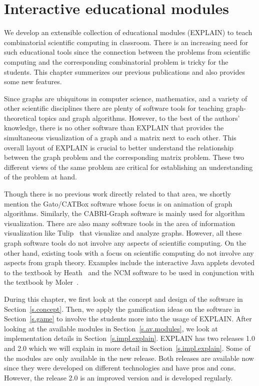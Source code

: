 \documentclass[12pt, twoside,a4paper,toc=bibliography]{scrbook}
\newcommand{\secref}[1]{Section~\protect\ref{#1}}
\begin{document}
\chapter{Interactive educational modules}
\label{explain}
We develop an extensible collection of educational modules (\mbox{EXPLAIN})
to teach combinatorial scientific computing in classroom.
There is an increasing need for such educational tools since the connection
between the problems from scientific computing and the corresponding combinatorial
problem is tricky for the students. This chapter summerizes our previous publications
\cite{2013:05,2014:01,2014:02,2014:09,2015:3} and also provides some new features.

Since graphs are ubiquitous in computer science, mathematics, and a variety of other scientific
disciplines there are plenty of software tools for teaching graph-theoretical topics and graph
algorithms. However, to the best of the authors' knowledge, there is no other software than EXPLAIN
that provides the simultaneous visualization of a graph and a matrix next to each other. This
overall layout of EXPLAIN is crucial to better understand the relationship between the graph
problem and the corresponding matrix problem. These two different views of the same problem are
critical for establishing an understanding of the problem at hand.

Though there is no previous work directly related to that area, we shortly mention the Gato/CATBox
\cite{gato2002} software whose focus is on animation of graph algorithms. Similarly, the
CABRI-Graph \cite{CABRI96} software is mainly used for algorithm visualization. There are also many
software tools in the area of information visualization like
Tulip~\cite{auber:tulip3,tulippython2012} that visualize and analyze graphs. However, all these
graph software tools do not involve any aspects of scientific computing. On the other hand,
existing tools with a focus on scientific computing do not involve any aspects from graph theory.
Examples include the interactive Java applets devoted to the textbook by Heath~\cite{MH96SCAIS} and
the NCM software to be used in conjunction with the textbook by Moler~\cite{mol:num}.

During this chapter, we first look at the concept and design of the software in
\secref{s.concept}. Then, we apply the gamification ideas on the software in
\secref{s.game} to involve the students more into the usage of \mbox{EXPLAIN}.
After looking at the available modules in \secref{s.av.modules}, we look at
implementation details in \secref{s.impl.explain}.
\mbox{EXPLAIN} has two releases 1.0 and 2.0 which we will explain in more
detail in \secref{s.impl.explain}. Some of the modules
are only available in the new release. Both releases
are available now since they were developed on different technologies and have
pros and cons. However, the release 2.0 is an improved version and is developed
regularly.
\end{document}
